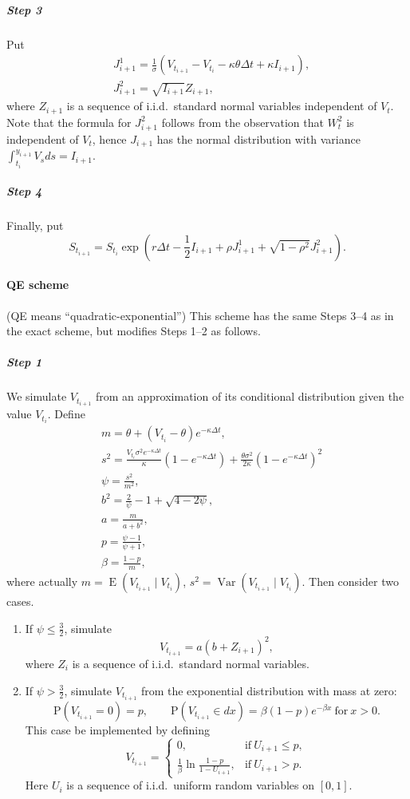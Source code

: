 \documentclass[a4paper,11pt,titlepage]{article}
\renewcommand{\P}{\mathrm{P}}
\DeclareMathOperator{\E}{E}
\DeclareMathOperator{\Var}{Var}
\theoremstyle{remark}
\begin{document}
\subparagraph{Step 3} Put
\begin{align*}
&J_{i+1}^1 = \frac{1}{\sigma} 
  (V_{t_{i+1}} - V_{t_i} - \kappa\theta\Delta t + \kappa I_{i+1}),\\
&J_{i+1}^2 = \sqrt{I_{i+1}} Z_{i+1},
\end{align*}
where $Z_{i+1}$ is a sequence of i.i.d.\ standard normal variables independent
of $V_t$. Note that the formula for $J_{i+1}^2$ follows from the observation
that $W_t^2$ is independent of $V_t$, hence $J_{i+1}$ has the normal
distribution with variance $\int_{t_i}^{y_{i+1}} V_s ds = I_{i+1}$.

\subparagraph{Step 4} Finally, put
\[
S_{t_{i+1}} = S_{t_i}
\exp\left( 
  r\Delta t - \frac12 I_{i+1} + \rho J^1_{i+1} + \sqrt{1-\rho^2} J^2_{i+1}
\right).
\]

\paragraph{QE scheme \citep{Andersen08}}
(QE means ``quadratic-exponential'') This scheme has the same Steps 3--4 as in
the exact scheme, but modifies Steps 1--2 as follows.

\subparagraph{Step 1} We simulate $V_{t_{i+1}}$ from an approximation of its
conditional distribution given the value $V_{t_i}$. Define
\begin{align*}
&m     = \theta + (V_{t_i}-\theta) e^{-\kappa \Delta t},\\
&s^2   = \frac{V_{t_i} \sigma^2 e^{-\kappa\Delta t}}{\kappa} (1-
         e^{-\kappa\Delta t}) + \frac{\theta\sigma^2}{2\kappa}
         (1 - e^{-\kappa\Delta t})^2\\
&\psi  = \frac{s^2}{m^2},\\
&b^2   = \frac{2}{\psi} - 1 +\sqrt{4-2\psi},\\
&a     = \frac{m}{a+b^2},\\
&p     = \frac{\psi - 1}{\psi+1},\\
&\beta = \frac{1-p}{m},
\end{align*}
where actually $m = \E(V_{t_{i+1}} \mid V_{t_i})$, $s^2 = \Var(V_{t_{i+1}} \mid
V_{t_i})$. Then consider two cases.
\begin{enumerate}
\item If $\psi \le \frac32$, simulate
\[
V_{t_{i+1}} =  a(b+Z_{i+1})^2,
\]
where $Z_{i}$ is a sequence of i.i.d.\ standard normal variables.

\item If $\psi > \frac32$, simulate $V_{t_{i+1}}$ from the exponential
distribution with mass at zero:
\[
\P(V_{t_{i+1}}=0) = p, \qquad 
\P(V_{t_{i+1}} \in dx) = \beta(1-p)e^{-\beta x}\ \text{for}\ x>0.
\]
This case be implemented by defining
\[
V_{t_{i+1}} =
\begin{cases}
  0,                                    &\text{if}\ U_{i+1} \le p,\\
  \frac1\beta \ln\frac{1-p}{1-U_{i+1}}, &\text{if}\ U_{i+1} > p.
\end{cases}
\]
Here $U_{i}$ is a sequence of i.i.d.\ uniform random variables on $[0,1]$.
\end{enumerate}
\end{document}
